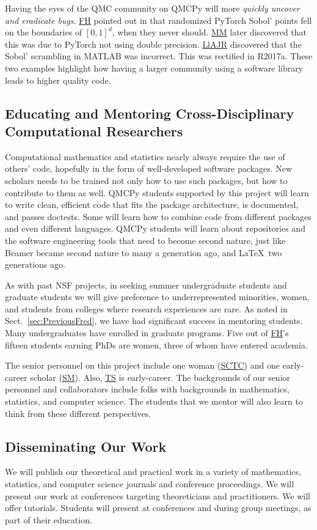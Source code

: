\documentclass[11pt]{NSFamsart}
\newcommand{\FH}{\hyperlink{FHlink}{FH}\xspace}
\newcommand{\SM}{\hyperlink{SMlink}{SM}\xspace}
\newcommand{\SCTC}{\hyperlink{SCTClink}{SCTC}\xspace}
\newcommand{\MM}{\hyperlink{MMlink}{MM}\xspace}
\newcommand{\TS}{\hyperlink{TSlink}{TS}\xspace}
\newcommand{\LlAJR}{\hyperlink{LlAJRlink}{LlAJR}\xspace}
\begin{document}
Having the eyes of the QMC community on QMCPy will more \emph{quickly uncover and eradicate bugs}.  \FH  pointed out in \cite{PyTorchFirstPt2020a} that randomized PyTorch Sobol' points fell on the boundaries of $[0,1]^d$, when they never should.  \MM later discovered that this was due to PyTorch not using double precision.  \LlAJR discovered that the  Sobol' scrambling in MATLAB was incorrect.  This was rectified in R2017a.  These two examples highlight how having a larger community using a software library leads to higher quality code.

\subsection{Educating and Mentoring Cross-Disciplinary Computational Researchers}
Computational mathematics and statistics nearly always require the use of others' code, hopefully in the form of well-developed software packages.  New scholars needs to be trained not only how to use such packages, but how to contribute to them as well.  QMCPy students supported by this project will learn to write clean, efficient code that fits the package architecture, is documented, and passes doctests.  Some will learn how to combine code from different packages and even different languages.  QMCPy students will learn about repositories and the software engineering tools that need to become second nature, just like Beamer became second nature to many a generation ago, and \LaTeX\ two generations ago.

As with past NSF projects, in seeking summer undergraduate students and graduate students we will give preference to underrepresented minorities, women, and students from colleges where research experiences are rare.  As noted in Sect.\ \ref{sec:PreviousFred}, we have had significant success in mentoring students.  Many undergraduates have enrolled in graduate programs.  Five out of \FH's fifteen students earning PhDs are women, three of whom have entered academia.

The senior personnel on this project include one woman (\SCTC) and one early-career scholar (\SM).  Also, \TS is early-career.  The backgrounds of our senior personnel and collaborators include folks with backgrounds in mathematics, statistics, and computer science.  The students  that we mentor will also learn to think from these different perspectives.

\subsection{Disseminating Our Work} We will publish our theoretical and practical work in a variety of mathematics, statistics, and computer science journals and conference proceedings. We will present our work at conferences targeting theoreticians and practitioners.  We will offer tutorials.  Students will present at conferences and during group meetings, as part of their education.
\end{document}
